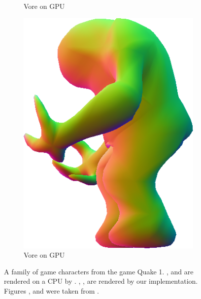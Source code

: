 \begin{figure}
\begin{subfigure}[b]{0.2\textwidth}
		\caption{Vore on GPU}
		\label{fig:results:cpugpu:gpuVore}
	\end{subfigure}	
	\hspace{0.1\textwidth}
	\begin{subfigure}[b]{0.2\textwidth}
		\centering
		\includegraphics[width=\textwidth]{content/img/results/shamblerGPU.png}
		\caption{Vore on GPU}
		\label{fig:results:cpugpu:gpuShambler}
	\end{subfigure}			
	\caption{A family of game characters from the game Quake 1. ,  and  are rendered on a CPU by \citeauthor{vlachos2001curved}. , ,  are rendered by our implementation. Figures ,  and  were taken from \textcite{vlachos2001curved}.}
	\label{fig:results:cpugpu}
\end{figure}

